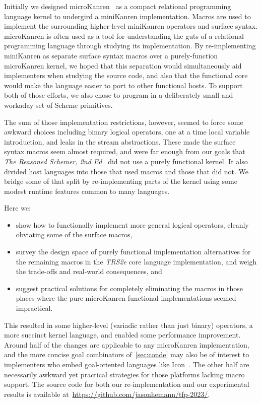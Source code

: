 \documentclass[sigplan,balance,pbalance,natbib=false]{acmart}
\begin{document}
Initially we designed microKanren~\cite{hemann2013muKanren} as a
compact relational programming language kernel to undergird a
miniKanren implementation. Macros are used to implement the
surrounding higher-level miniKanren operators and surface syntax.\@
microKanren is often used as a tool for understanding the guts of a
relational programming language through studying its implementation.
By re-implementing miniKanren as separate surface syntax macros over a
purely-function microKanren kernel, we hoped that this separation
would simultaneously aid implementers when studying the source code,
and also that the functional core would make the language easier to
port to other functional hosts. To support both of those efforts, we
also chose to program in a deliberately small and workaday set of
Scheme primitives.

The sum of those implementation restrictions, however, seemed to force
some awkward choices including binary logical operators, one at a time
local variable introduction, and leaks in the stream abstractions.
These made the surface syntax macros seem almost required, and were
far enough from our goals that \emph{The Reasoned Schemer, 2nd
  Ed}~\cite{friedman2018reasoned} did not use a purely functional
kernel. It also divided host languages into those that used macros and
those that did not. We bridge some of that split by re-implementing
parts of the kernel using some modest runtime features common to many
languages.

Here we:
%
\begin{itemize}

\item show how to functionally implement more general logical
  operators, cleanly obviating some of the surface macros,

\item survey the design space of purely functional implementation
  alternatives for the remaining macros in the \emph{TRS2e} core
  language implementation, and weigh the trade-offs and real-world
  consequences, and

\item suggest practical solutions for completely eliminating the
  macros in those places where the pure microKanren functional
  implementations seemed impractical.

\end{itemize}

This resulted in some higher-level (variadic rather than just binary)
operators, a more succinct kernel language, and enabled some
performance improvement. Around half of the changes are applicable to
any microKanren implementation, and the more concise goal combinators
of~\cref{sec:conde} may also be of interest to implementers who embed
goal-oriented languages like Icon~\cite{griswold1983icon}. The other
half are necessarily awkward yet practical strategies for those
platforms lacking macro support. The source code for both our
re-implementation and  our experimental results is available
at~\url{https://github.com/jasonhemann/tfp-2023/}.
\end{document}
